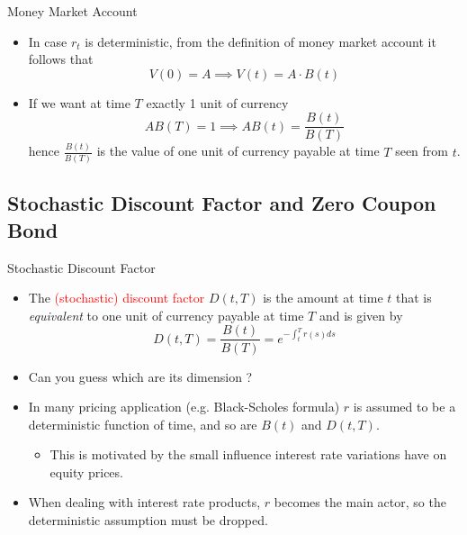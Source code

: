 \documentclass{beamer}
\begin{document}
\begin{frame}{Money Market Account}
	\begin{itemize}
		\item In case $r_t$ is deterministic, from the definition of money market account it follows that 
		\begin{equation*}
			V(0) = A \implies V(t) = A\cdot B(t)
		\end{equation*}
		\item If we want at time $T$ exactly 1 unit of currency
		\begin{equation*}
			AB(T) = 1 \implies AB(t) = \frac{B(t)}{B(T)} 
		\end{equation*}
		hence $\frac{B(t)}{B(T)}$ is the value of one unit of currency payable at time $T$ seen from $t$.
		
	\end{itemize}
\end{frame}

\subsection{Stochastic Discount Factor and Zero Coupon Bond}
\begin{frame}{Stochastic Discount Factor}
	\begin{itemize}
		\item The \textcolor{red}{(stochastic) discount factor} $D(t, T)$ is the amount at time $t$ that is \emph{equivalent} to one unit of currency payable at time $T$ and is given by
		\begin{equation}
			D(t, T) = \frac{B(t)}{B(T)} = e^{-\int_t^T r(s) ds}
		\end{equation}
		\item Can you guess which are its dimension ?	
		\item In many pricing application (e.g. Black-Scholes formula) $r$ is assumed to be a deterministic function of time, and so are $B(t)$ and $D(t,T)$.
		\begin{itemize}
			\item This is motivated by the small influence interest rate variations have on equity prices.
		\end{itemize}
		\item When dealing with interest rate products, $r$ becomes the main actor, so the deterministic assumption must be dropped.
	\end{itemize}	
\end{frame}
\end{document}
